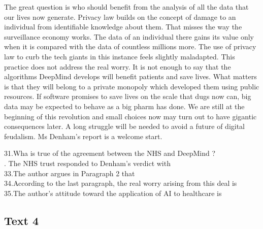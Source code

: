 The great question is who should benefit from the analysis of all the data that our lives now generate. Privacy law builds on the concept of damage to an individual from identifiable knowledge about them. That misses the way the surveillance economy works. The data of an individual there gains its value only when it is compared with the data of countless millions more.
The use of privacy law to curb the tech giants in this instance feels slightly maladapted. This practice does not address the real worry. It is not enough to say that the algorithms DeepMind develops will benefit patients and save lives. What matters is that they will belong to a private monopoly which developed them using public resources. If software promises to save lives on the scale that dugs now can, big data may be expected to behave as a big pharm has done. We are still at the beginning of this revolution and small choices now may turn out to have gigantic consequences later. A long struggle will be needed to avoid a future of digital feudalism. Ms Denham's report is a welcome start.
\begin{questions} \question 31.Wha is true of the agreement between the NHS and DeepMind ?
\\ . The NHS trust responded to Denham's verdict with
\\ \question  33.The author argues in Paragraph 2 that
\\ \question 34.According to the last paragraph, the real worry arising from this deal is
\\ \question 35.The author's attitude toward the application of AI to healthcare is
\\ \end{questions}      \subsection{Text 4}
